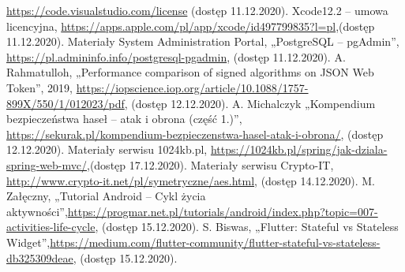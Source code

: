 \documentclass[twoside]{projektInzynierskiMS}
\numberwithin{figure}{section}
\begin{document}
\begin{thebibliography}{12}
\url{https://code.visualstudio.com/license} (dostęp 11.12.2020).
 Xcode12.2 – umowa licencyjna, \newline
\url{https://apps.apple.com/pl/app/xcode/id497799835?l=pl},\newline (dostęp 11.12.2020).
 Materiały System Administration Portal, „PostgreSQL -- pgAdmin”, \newline
\url{https://pl.admininfo.info/postgresql-pgadmin}, (dostęp 11.12.2020).
 A. Rahmatulloh, „Performance comparison of signed algorithms on JSON Web Token”, 2019,  \newline \url{https://iopscience.iop.org/article/10.1088/1757-899X/550/1/012023/pdf}, (dostęp 12.12.2020).
\newpage
{} A. Michalczyk „Kompendium bezpieczeństwa haseł – atak i obrona (część 1.)”, \newline \url{https://sekurak.pl/kompendium-bezpieczenstwa-hasel-atak-i-obrona/}, (dostęp 12.12.2020).
 Materiały serwisu 1024kb.pl, \newline \url{https://1024kb.pl/spring/jak-dziala-spring-web-mvc/},\newline (dostęp 17.12.2020).
 Materiały serwisu Crypto-IT, \newline \url{http://www.crypto-it.net/pl/symetryczne/aes.html}, (dostęp 14.12.2020).
 M. Załęczny, „Tutorial Android -- Cykl życia aktywności”,\newline \url{https://progmar.net.pl/tutorials/android/index.php?topic=007-activities-life-cycle}, (dostęp 15.12.2020).
 S. Biswas, „Flutter: Stateful vs Stateless Widget”,\newline \url{https://medium.com/flutter-community/flutter-stateful-vs-stateless-db325309deae}, (dostęp 15.12.2020).
\end{thebibliography}
\end{document}
